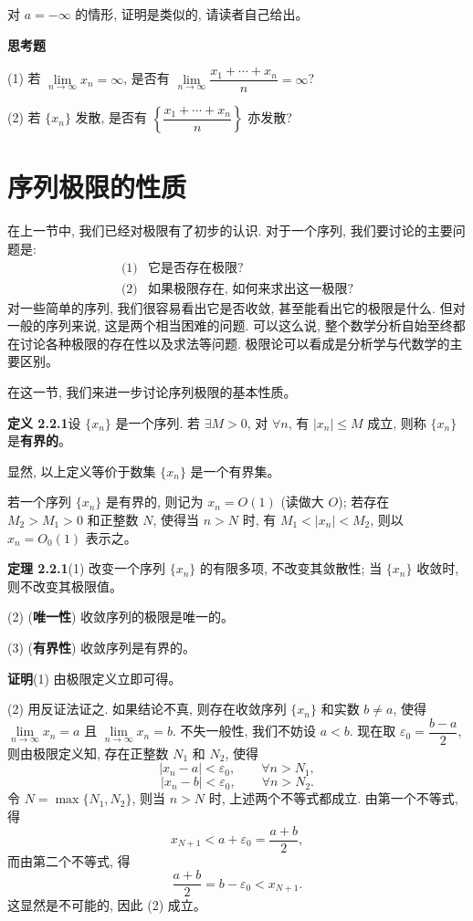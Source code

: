 \documentclass[UTF8, 12pt, fontset=fandol, oneside]{ctexart}
\begin{document}
对 $a=-\infty$ 的情形, 证明是类似的, 请读者自己给出。

\noindent\textbf{思考题}

(1) 若 $\lim\limits_{n\to\infty}x_n=\infty$, 是否有 $\lim\limits_{n\to\infty}\dfrac{x_1+\cdots+x_n}{n}=\infty$?

(2) 若 $\{x_n\}$ 发散, 是否有 $\left\{\dfrac{x_1+\cdots+x_n}{n}\right\}$ 亦发散?

\section{序列极限的性质}

在上一节中, 我们已经对极限有了初步的认识. 对于一个序列, 我们要讨论的主要问题是:
\[
\begin{array}{ll}
  \text{(1)} & \text{它是否存在极限?}\\
  \text{(2)} & \text{如果极限存在, 如何来求出这一极限?}
\end{array}
\]
对一些简单的序列, 我们很容易看出它是否收敛, 甚至能看出它的极限是什么. 但对一般的序列来说, 这是两个相当困难的问题. 可以这么说, 整个数学分析自始至终都在讨论各种极限的存在性以及求法等问题. 极限论可以看成是分析学与代数学的主要区别。

在这一节, 我们来进一步讨论序列极限的基本性质。

\noindent\textbf{定义 2.2.1}\quad 设 $\{x_n\}$ 是一个序列. 若 $\exists M>0$, 对 $\forall n$, 有 $|x_n|\leqslant M$ 成立, 则称 $\{x_n\}$ 是\textbf{有界的}。

显然, 以上定义等价于数集 $\{x_n\}$ 是一个有界集。

若一个序列 $\{x_n\}$ 是有界的, 则记为 $x_n=O(1)$ (读做大 $O$); 若存在 $M_2>M_1>0$ 和正整数 $N$, 使得当 $n>N$ 时, 有 $M_1<|x_n|<M_2$, 则以 $x_n=O_0(1)$ 表示之。

\noindent\textbf{定理 2.2.1}\quad (1) 改变一个序列 $\{x_n\}$ 的有限多项, 不改变其敛散性; 当 $\{x_n\}$ 收敛时, 则不改变其极限值。

(2) (\textbf{唯一性}) 收敛序列的极限是唯一的。

(3) (\textbf{有界性}) 收敛序列是有界的。

\noindent\textbf{证明}\quad (1) 由极限定义立即可得。

(2) 用反证法证之. 如果结论不真, 则存在收敛序列 $\{x_n\}$ 和实数 $b\ne a$, 使得 $\lim\limits_{n\to\infty}x_n=a$ 且 $\lim\limits_{n\to\infty}x_n=b$. 不失一般性, 我们不妨设 $a<b$. 现在取 $\varepsilon_0=\dfrac{b-a}{2}$, 则由极限定义知, 存在正整数 $N_1$ 和 $N_2$, 使得
\[
  |x_n-a|<\varepsilon_0,\qquad \forall n>N_1,
\]
\[
  |x_n-b|<\varepsilon_0,\qquad \forall n>N_2.
\]
令 $N=\max\{N_1,N_2\}$, 则当 $n>N$ 时, 上述两个不等式都成立. 由第一个不等式, 得
\[
  x_{N+1}<a+\varepsilon_0=\frac{a+b}{2},
\]
而由第二个不等式, 得
\[
  \frac{a+b}{2}=b-\varepsilon_0<x_{N+1}.
\]
这显然是不可能的, 因此 (2) 成立。
\end{document}
